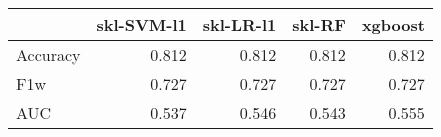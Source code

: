 \begin{tabular}{lrrrr}
\toprule
{} &  skl-SVM-l1 &  skl-LR-l1 &  skl-RF &  xgboost \\
\midrule
Accuracy &       0.812 &      0.812 &   0.812 &    0.812 \\
F1w      &       0.727 &      0.727 &   0.727 &    0.727 \\
AUC      &       0.537 &      0.546 &   0.543 &    0.555 \\
\bottomrule
\end{tabular}
